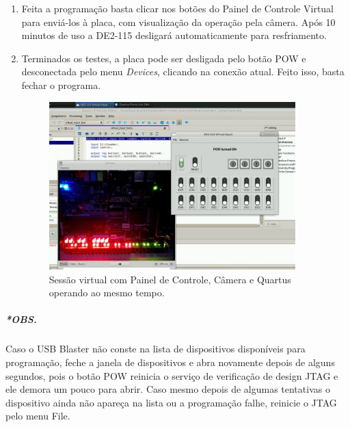 \documentclass[12pt]{article}
\begin{document}
\begin{enumerate}[font=\bfseries]
    \item Feita a programação basta clicar nos botões do Painel de Controle Virtual para enviá-los à placa, com visualização da operação pela câmera. Após 10 minutos de uso a DE2-115 desligará automaticamente para resfriamento.

    \item Terminados os testes, a placa pode ser desligada pelo botão POW e desconectada pelo menu \textit{Devices}, clicando na conexão atual. Feito isso, basta fechar o programa.
    
    \begin{figure}[H]
    \centering
    \includegraphics[width=0.9\textwidth]{img/operacao.jpg}
    \caption{\label{ref:operacao}Sessão virtual com Painel de Controle, Câmera e Quartus operando ao mesmo tempo.}
    \end{figure}
    
\end{enumerate}

\subparagraph{*OBS.} Caso o USB Blaster não conste na lista de dispositivos disponíveis para programação, feche a janela de dispositivos e abra novamente depois de alguns segundos, pois o botão POW reinicia o serviço de verificação de design JTAG e ele demora um pouco para abrir.
Caso mesmo depois de algumas tentativas o dispositivo ainda não apareça na lista ou a programação falhe, reinicie o JTAG pelo menu File.
\end{document}
